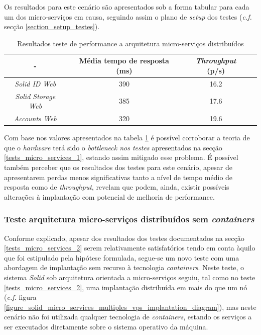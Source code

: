 Os resultados para este cenário são apresentados sob a forma tabular para cada um dos micro-serviços em causa, seguindo assim o plano de \emph{setup} dos testes (\emph{c.f.} secção \ref{section_setup_testes}).

\begin{table}[h]
\centering
\caption{Resultados teste de performance a arquitetura micro-serviços distribuídos}
\label{r_t_m_s_2}
\vspace{0.5cm}
\begin{tabular}{c|c|c|c} 
 - & Média tempo de resposta (ms) & \emph{Throughput} (p/s) \\
\hline                          
\emph{Solid ID Web} & 390 & 16.2 \\
\emph{Solid Storage Web} & 385 & 17.6 \\
\emph{Accounts Web} & 320 & 19.6 \\
\end{tabular}
\end{table}

Com base nos valores apresentados na tabela \ref{r_t_m_s_2} é possível corroborar a teoria de que o \emph{hardware} terá sido o \emph{bottleneck nos testes} apresentados na secção \ref{tests_micro_services_1}, estando assim mitigado esse problema. É possível também perceber que os resultados dos testes para este cenário, apesar de apresentarem perdas menos significativas tanto a nível de tempo médio de resposta como de \emph{throughput}, revelam que podem, ainda, existir possíveis alterações à implantação com potencial de melhoria de performance.

\subsubsection{Teste arquitetura micro-serviços distribuídos sem \emph{containers} \label{tests_micro_services_3}}

Conforme explicado, apesar dos resultados dos testes documentados na secção \ref{tests_micro_services_2} serem relativamente satisfatórios tendo em conta àquilo que foi estipulado pela hipótese formulada, segue-se um novo teste com uma abordagem de implantação sem recurso à tecnologia \emph{containers}.
Neste teste, o sistema \emph{Solid} sob arquitetura orientada a micro-serviços seguiu, tal como no teste \ref{tests_micro_services_2}, uma implantação distribuída em mais do que um nó (\emph{c.f.} figura \ref{figure_solid_micro_services_multiples_vps_implantation_diagram}), mas neste cenário não foi utilizada qualquer tecnologia de \emph{containers}, estando os serviços a ser executados diretamente sobre o sistema operativo da máquina.

